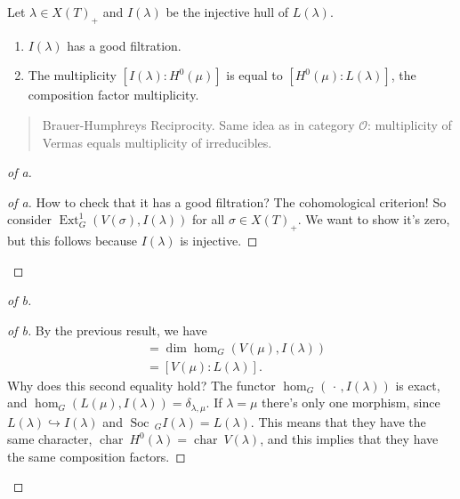 \begin{theorem}[?]

\begin{theorem}[?]

Let \(\lambda \in X(T)_+\) and \(I(\lambda)\) be the injective hull of
\(L(\lambda)\).

\begin{enumerate}
\def\labelenumi{\alph{enumi}.}
\item
  \(I(\lambda)\) has a good filtration.
\item
  The multiplicity \([I(\lambda): H^0(\mu)]\) is equal to
  \([H^0(\mu): L(\lambda)]\), the composition factor multiplicity.
\end{enumerate}

\begin{quote}
Brauer-Humphreys Reciprocity. Same idea as in category
\({\mathcal{O}}\): multiplicity of Vermas equals multiplicity of
irreducibles.
\end{quote}

\end{theorem}

\end{theorem}

\begin{proof}[of a]

\begin{proof}[of a]

How to check that it has a good filtration? The cohomological criterion!
So consider \(\operatorname{Ext}^1_G( V(\sigma), I(\lambda) )\) for all
\(\sigma \in X(T)_+\). We want to show it's zero, but this follows
because \(I(\lambda)\) is injective.

\end{proof}

\end{proof}

\begin{proof}[of b]

\begin{proof}[of b]

By the previous result, we have
\begin{align*}   [I(\lambda): H^0(\mu) ]  &= \dim \hom_G(V(\mu), I(\lambda)) \\ &= [V(\mu): L(\lambda) ] .\end{align*}
Why does this second equality hold? The functor
\(\hom_G({\,\cdot\,}, I(\lambda))\) is exact, and
\(\hom_G(L(\mu), I(\lambda)) = \delta_{\lambda, \mu}\). If
\(\lambda = \mu\) there's only one morphism, since
\(L(\lambda) \hookrightarrow I(\lambda)\) and
\(\operatorname{Soc}\,_G I(\lambda) = L(\lambda)\). This means that they
have the same character,
\(\operatorname{char}~H^0(\lambda) = \operatorname{char}~V(\lambda)\),
and this implies that they have the same composition factors.

\end{proof}

\end{proof}

